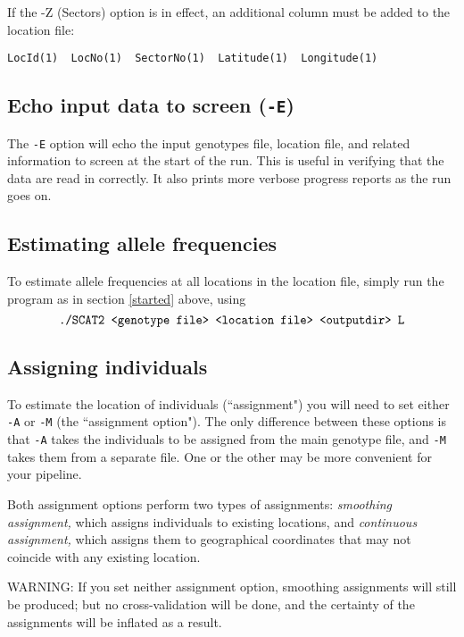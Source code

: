 \documentclass[10pt,titlepage,times,letterpaper]{article}
\begin{document}
If the -Z (Sectors) option is in effect, an additional column must be added to
the location file:

\begin{small}
\begin{verbatim}
LocId(1)  LocNo(1)  SectorNo(1)  Latitude(1)  Longitude(1)
\end{verbatim}
\end{small}

\subsection{Echo input data to screen ({\tt -E})}
The {\tt -E} option will echo the input genotypes file, location file, and 
related information
to screen at the start of the run.  This is useful in verifying that the data
are read in correctly.  It also prints more verbose progress reports as
the run goes on.

\subsection{Estimating allele frequencies}

To estimate allele frequencies at all locations in the location
file, simply run the program as in section \ref{started} above,
using
$$\text{{\tt ./SCAT2 <genotype file> <location file> <outputdir> L}}$$

\subsection{Assigning individuals}  \label{assign}

To estimate the location of individuals (``assignment") you will need
to set either {\tt -A} or {\tt -M} (the ``assignment option").  The
only difference between these options is that {\tt -A} takes the
individuals to be assigned from the main genotype file, and {\tt -M}
takes them from a separate file.  One or the other may be more
convenient for your pipeline.  

Both assignment options perform two types of assignments: {\it smoothing
 assignment,} which assigns individuals to existing locations, and 
{\it continuous assignment,} which
assigns them to geographical coordinates that may not coincide with any
existing location. 

WARNING:  If you set neither assignment option, smoothing assignments
will still be produced; but no cross-validation will be done, and the certainty of
the assignments will be inflated as a result.
\end{document}
